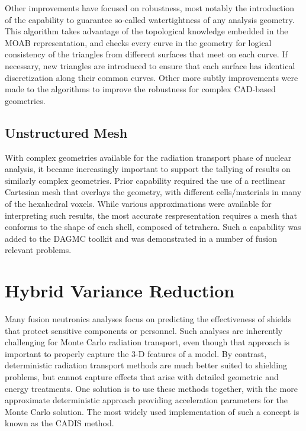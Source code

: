 Other improvements have focused on robustness, most notably the introduction
of the capability to guarantee so-called watertightness of any analysis
geometry.  This algorithm takes advantage of the topological knowledge
embedded in the \gls{MOAB} representation, and checks every curve in the
geometry for logical consistency of the triangles from different surfaces that
meet on each curve.  If necessary, new triangles are introduced to ensure that
each surface has identical discretization along their common
curves. Other more subtly improvements were made to the
algorithms to improve the robustness for complex \gls{CAD}-based
geometries.

\subsection{Unstructured Mesh}\label{sec:umesh}

With complex geometries available for the radiation transport phase of nuclear
analysis, it became increasingly important to support the tallying of results
on similarly complex geometries.  Prior capability required the use of a
rectlinear Cartesian mesh that overlays the geometry, with different
cells/materials in many of the hexahedral voxels.  While various
approximations were available for interpreting such results, the most accurate
respresentation requires a mesh that conforms to the shape of each shell,
composed of tetrahera.  Such a capability was added to the \gls{DAGMC} toolkit
and was demonstrated in a number of fusion relevant
problems.

\section{Hybrid Variance Reduction}\label{sec:hybrid}

Many fusion neutronics analyses focus on predicting the effectiveness of
shields that protect sensitive components or personnel.  Such analyses are
inherently challenging for Monte Carlo radiation transport, even though that
approach is important to properly capture the 3-D features of a model.  By
contrast, deterministic radiation transport methods are much better suited to
shielding problems, but cannot capture effects that arise with detailed
geometric and energy treatments.  One solution is to use these methods
together, with the more approximate deterministic approach providing
acceleration parameters for the Monte Carlo solution.  The most widely used
implementation of such a concept is known as the \gls{CADIS}
method.

